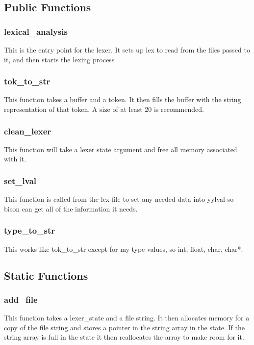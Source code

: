 \documentclass[11pt]{article}
\begin{document}
        \subsection{Public Functions}
            
            \subsubsection{lexical\_analysis}
                This is the entry point for the lexer. It sets up lex to read from the files passed to it, and then starts the lexing process

            \subsubsection{tok\_to\_str}
                This function takes a buffer and a token. It then fills the buffer with the string representation of that token.
                A size of at least 20 is recommended.

            \subsubsection{clean\_lexer}
                This function will take a lexer state argument and free all memory associated with it.

            \subsubsection{set\_lval}
                This function is called from the lex file to set any needed data into yylval so bison can get 
                all of the information it needs.

            \subsubsection{type\_to\_str}
                This works like tok\_to\_str except for my type values, so int, float, char, char*.

        \subsection{Static Functions}

            \subsubsection{add\_file}
                This function takes a lexer\_state and a file string. It then allocates memory for a copy of the file string
                and stores a pointer in the string array in the state. If the string array is full in the state it
                then reallocates the array to make room for it.
\end{document}
